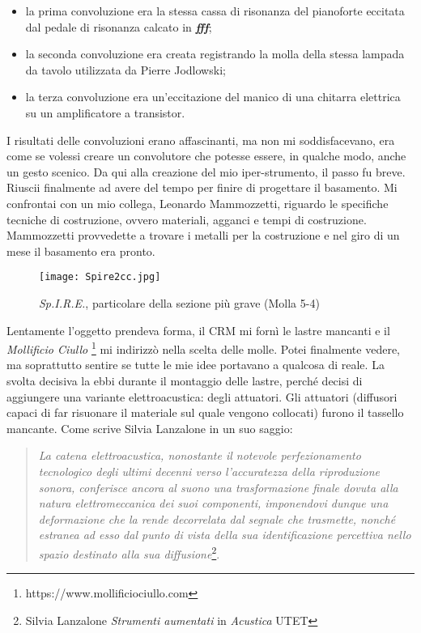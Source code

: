 \begin{itemize}
\item{la prima convoluzione era la stessa cassa di risonanza del pianoforte eccitata dal pedale di risonanza calcato in \textit{\textbf{fff}};}
\item{la seconda convoluzione era creata registrando la molla della stessa lampada da tavolo utilizzata da Pierre Jodlowski;}
\item{la terza convoluzione era un'eccitazione del manico di una chitarra elettrica su un amplificatore a transistor.}
\end{itemize}

%

I risultati delle convoluzioni erano affascinanti, ma non mi soddisfacevano,  era come se volessi creare un convolutore che potesse essere, in qualche modo, anche un gesto scenico. Da qui alla creazione del mio iper-strumento, il passo fu breve. Riuscii finalmente ad avere del tempo per finire di progettare il basamento. Mi confrontai con un mio collega, Leonardo Mammozzetti, riguardo le specifiche tecniche di costruzione, ovvero materiali, agganci e tempi di costruzione. Mammozzetti provvedette a trovare i metalli per la costruzione e nel giro di un mese il basamento era pronto.

\begin{figure}[htbp]
\begin{center}
\texttt{[image: Spire2cc.jpg]}
\caption{\textit{Sp.I.R.E.}, particolare della sezione più grave (Molla 5-4)}
\label{default}
\end{center}
\end{figure}

Lentamente l'oggetto prendeva forma, il CRM mi fornì le lastre mancanti e il \textit{Mollificio Ciullo} \footnote{https://www.mollificiociullo.com} mi indirizzò nella scelta delle molle. Potei finalmente vedere, ma soprattutto sentire se tutte le mie idee portavano a qualcosa di reale. La svolta decisiva la ebbi durante il montaggio delle lastre, perché decisi di aggiungere una variante elettroacustica: degli attuatori. Gli attuatori (diffusori capaci di far risuonare il materiale sul quale vengono collocati) furono il tassello mancante. Come scrive Silvia Lanzalone in un suo saggio:

\begin{quotation}
\textit{La catena elettroacustica, nonostante il notevole perfezionamento tecnologico degli ultimi decenni verso l'accuratezza della riproduzione sonora, conferisce ancora al suono una trasformazione finale dovuta alla natura elettromeccanica dei suoi componenti, imponendovi dunque una deformazione che la rende decorrelata dal segnale che trasmette, nonché estranea ad esso dal punto di vista della sua identificazione percettiva nello spazio destinato alla sua diffusione}\footnote{Silvia Lanzalone \textit{Strumenti aumentati} in \textit{Acustica} UTET}.
\end{quotation}

